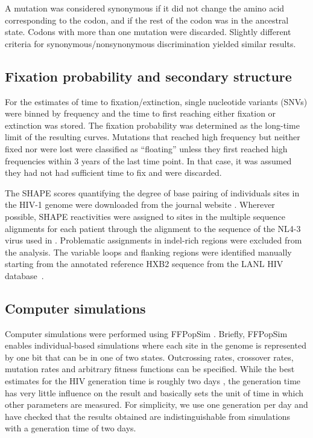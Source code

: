 \documentclass[11pt]{article}
\begin{document}
A mutation was considered synonymous if it did not change the amino acid
corresponding to the codon, and if the rest of the codon was in the ancestral
state. Codons with more than one mutation were discarded. Slightly different
criteria for synonymous/nonsynonymous discrimination yielded similar results.

\subsection*{Fixation probability and secondary structure}
For the estimates of time to fixation/extinction, single nucleotide variants
(SNVs) were binned by
frequency and the time to first reaching either fixation or extinction was
stored. The fixation probability was determined as the long-time limit of the
resulting curves. Mutations that reached high frequency but neither fixed nor
were lost were classified as ``floating'' unless they first
reached high frequencies within 3 years of the last time point. In that case, it was assumed
they had not had sufficient time to fix and were discarded.

The SHAPE scores quantifying the degree of base pairing of individuals sites in
the HIV-1 genome were downloaded from the journal website
\citep{watts_architecture_2009}. Wherever possible, SHAPE reactivities were
assigned to sites in the multiple sequence alignments for each patient through
the alignment to the sequence of the NL4-3 virus used in
\citep{watts_architecture_2009}. Problematic assignments in indel-rich
regions were excluded from the analysis. The variable loops and flanking
regions were identified manually starting from the annotated reference HXB2
sequence from the LANL HIV database~\citep{LANL2012}. 

\subsection*{Computer simulations}
Computer simulations were performed using FFPopSim
\citep{zanini_ffpopsim:_2012}. Briefly, FFPopSim enables individual-based
simulations where each site in the genome is represented by one bit that can be
in one of two states. Outcrossing rates, crossover rates, mutation rates and
arbitrary fitness functions can be specified. While the best estimates
for the HIV generation time is roughly two days
\citep{perelson_hiv-1_1996, markowitz_novel_2003}, the generation time
has very little influence on the result and basically sets the unit of
time in which other parameters are measured. For simplicity, we use one
generation per day and have checked that the results obtained are
indistinguishable from simulations with a generation time of two days.
\end{document}
